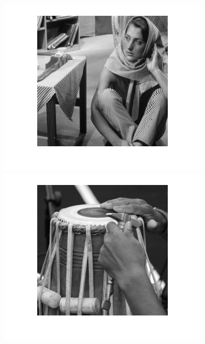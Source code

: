 \begin{figure}
{\begin{minipage}[b]{0.23\linewidth}
\includegraphics[width=1\linewidth]{images/barbara_ori.png}\vspace{4pt}
\includegraphics[width=1\linewidth]{images/pakhawaj_ori.png}
\end{minipage}}
\end{figure}
